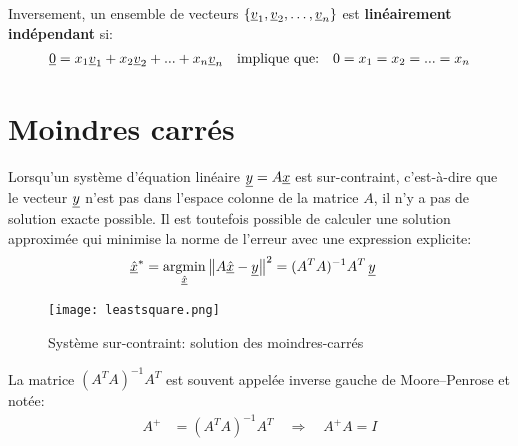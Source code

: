 Inversement, un ensemble de vecteurs $\left\{ \underline{v}_1, \underline{v}_2, \hdots, \underline{v}_n \right\}$ est \textbf{linéairement indépendant} si:
\begin{align}
\underline{0} = x_1 \underline{v}_1 + x_2 \underline{v}_2 + ... + x_n \underline{v}_n
\quad
\text{implique que:}
\quad
0 = x_1 = x_2 = ... = x_n 
\end{align}






\newpage
\section{Moindres carrés}
\label{sec:moindrecarre}

Lorsqu'un système d'équation linéaire $\underline{y} = A \underline{x}$ est sur-contraint, c'est-à-dire que le vecteur $\underline{y}$ n'est pas dans l'espace colonne de la matrice $A$, il n'y a pas de solution exacte possible. Il est toutefois possible de calculer une solution approximée qui minimise la norme de l'erreur avec une expression explicite:
\begin{align}
\col{\hat{x}}^* &= \operatornamewithlimits{argmin}\limits_{\col{\hat{x}}} \left\| A \col{\hat{x}} - \col{y} \right\|^2
= (A^T A)^{-1} A^T \, \col{y}
\end{align}
\begin{figure}[htbp]
	\centering
		\texttt{[image: leastsquare.png]}
	\caption{Système sur-contraint: solution des moindres-carrés}
	\label{fig:leastsquare}
\end{figure}

La matrice $(A^T A)^{-1} A^T$ est souvent appelée inverse gauche de Moore–Penrose et notée:
\begin{align}
A^{+} &= (A^T A)^{-1} A^T  \quad \Rightarrow \quad A^{+} A = I
\end{align}

